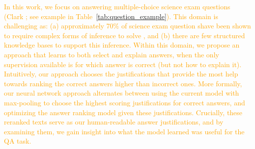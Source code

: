 \textcolor{orange}{In this work, we focus on answering multiple-choice science exam questions (Clark \citeyear{clark:2015}; see example in Table~\ref{tab:question_example}). 
This domain is challenging as: (a) approximately 70\% of science exam question shave been shown to require complex forms of inference to solve \cite{clark:2013,jansen-EtAl:2016:COLING}, and (b) there are few structured knowledge bases to support this inference.  
Within this domain, we propose an approach that learns to both select and explain answers, when the only supervision available is for which answer is correct (but not how to explain it).
Intuitively, our approach chooses the justifications that provide the most help towards ranking the correct answers higher than incorrect ones.
More formally, our neural network approach alternates between using the current model with max-pooling to choose the highest scoring justifications for correct answers, and optimizing the answer ranking model given these justifications. 
Crucially, these reranked texts serve as our human-readable answer justifications, and by examining them, we gain insight into what the model learned was useful for the QA task.  }





\address{Applied to science MCQA }

\address{Description (clark and jansen stuff)}

\address{Lure answers}

\address{To get a complete and valid explanation for selection of answer choice, may need to aggregate info from multiple distinct resources}

\address{For aggregation, to prevent semantic drift, use structured representations (parts of CL2017)}

\address{Robustness - shallower, no structure, learned representations (EMNLP2017-hopeful)}



